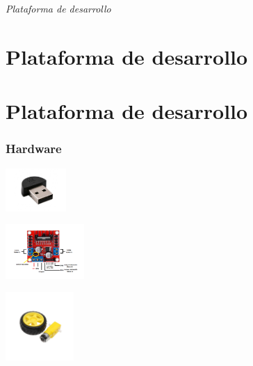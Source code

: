 \documentclass{beamer}
\begin{document}
\section*{}
\begin{frame}{}
  \centering \Huge
  \emph{Plataforma de desarrollo}
\end{frame}

\section{Plataforma de desarrollo}
\section{Plataforma de desarrollo}
\begin{frame}
\frametitle{Hardware}
\centering

\begin{minipage}{0.3\textwidth}
    \centering
    \includegraphics[width=2.3cm]{figs/microfono-usb.jpg}
\end{minipage}
\hfill
\begin{minipage}{0.3\textwidth}
    \centering
    \includegraphics[width=3.0cm]{figs/L298N.png}
\end{minipage}
\hfill
\begin{minipage}{0.3\textwidth}
    \centering
    \includegraphics[width=2.6cm]{figs/motor.jpg}
\end{minipage}

\vspace{-0.3cm} %



\end{frame}
\end{document}

